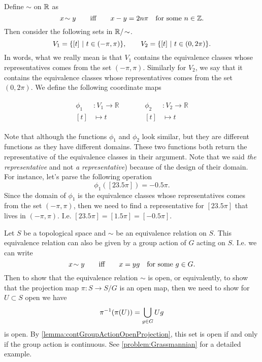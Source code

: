 \begin{summary}
	Define $ \sim $ on $ \mathbb{R} $ as
	\[ x\sim y \qquad \text{iff} \qquad x-y = 2n\pi \quad\text{for some $ n \in \Z $}. \]
	Then consider the following sets in $ \R/\sim $.
	\[ V_1 = \{[t]\ |\ t\in (-\pi,\pi) \}, \qquad V_2 = \{[t]\ |\ t\in(0,2\pi)\}. \]
	In words, what we really mean is that $ V_1 $ contains the equivalence classes whose representatives comes from the set $ (-\pi,\pi) $. Similarly for $ V_2 $, we say that it contains the equivalence classes whose representatives comes from the set $ (0,2\pi) $. We define the following coordinate maps
	
	\[
	\begin{array}{cc}
		\begin{aligned}
			\phi_1 &: V_1 \to \mathbb{R} \\
			[t] &\mapsto t 
		\end{aligned}
		&\qquad
		\begin{aligned}
			\phi_2 &: V_2 \to \mathbb{R} \\
			[t] & \mapsto t 
		\end{aligned}
	\end{array}
	\]
	
	Note that although the functions $ \phi_1 $ and $ \phi_2 $ look similar, but they are different functions as they have different domains. These two functions both return the representative of the equivalence classes in their argument. Note that we said \emph{the representative} and not \emph{a representative}) because of the design of their domain. For instance, let's parse the following operation 
	\[ \phi_1 ([23.5\pi]) =  -0.5\pi. \]
	Since the domain of $ \phi_1 $ is the equivalence classes whose representatives comes from the set $ (-\pi,\pi) $, then we need to find a representative for $ [23.5\pi] $ that lives in $ (-\pi,\pi) $. I.e. $ [23.5\pi] = [1.5\pi] = [-0.5\pi] $.
\end{summary}

\begin{summary}
	Let $ S $ be a topological space and $ \sim $ be an equivalence relation on $ S $. This equivalence relation can also be given by a group action of $ G $ acting on $ S $. I.e. we can write
	\[ x\sim y \qquad \text{iff}  \qquad x = yg \quad \text{for some $ g \in G $}. \] 
	Then to show that the equivalence relation $ \sim $ is open, or equivalently, to show that the projection map $ \pi : S \to S/G $ is an open map, then we need to show for $ U \subset S $ open we have
	\[ \pi^{-1}(\pi(U)) = \bigcup_{g\in G} Ug \]
	is open. By \autoref{lemma:contGroupActionOpenProjection}, this set is open if and only if the group action is continuous. See \autoref{problem:Grassmannian} for a detailed example.
\end{summary}

